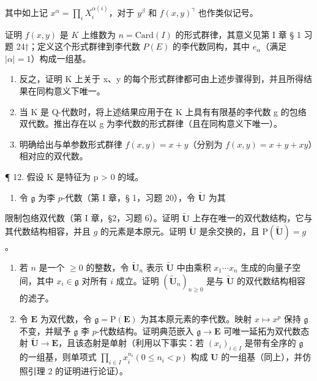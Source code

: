 其中如上记 \(x^{\alpha} = \prod_{i} X_{i}^{\alpha(i)}\)，对于 \(y^{\beta}\) 和 \(f(x, y)^{\gamma}\) 也作类似记号。

证明 \(f(x, y)\) 是 \(K\) 上维数为 \(n = \text{Card}(I)\) 的形式群律，其意义见第 I 章 § 1 习题 24†；定义这个形式群律到李代数 \(P(E)\) 的李代数同构，其中 \(e_{\alpha}\)（满足 \(|\alpha| = 1\)）构成一组基。

\begin{enumerate}
\def\labelenumi{(\alph{enumi})}
\setcounter{enumi}{2}
\item
  反之，证明 K 上关于 x、y 的每个形式群律都可由上述步骤得到，并且所得结果在同构意义下唯一。
\item
  当 K 是 Q-代数时，将上述结果应用于在 K 上具有有限基的李代数 g 的包络双代数。推出存在以 g 为李代数的形式群律（且在同构意义下唯一）。
\item
  明确给出与单参数形式群律 \(f(x, y) = x + y\)（分别为 \(f(x, y) = x + y + xy\)）相对应的双代数。
\end{enumerate}

¶ 12. 假设 K 是特征为 p > 0 的域。

\begin{enumerate}
\def\labelenumi{(\alph{enumi})}
\tightlist
\item
  令 \(\mathfrak{g}\) 为李 \(p\)-代数（第 I 章，§ 1，习题 20），令 \(\tilde{\mathbf{U}}\) 为其
\end{enumerate}


限制包络双代数（第 I 章，§2，习题 6）。证明 \(\tilde{\mathbf{U}}\) 上存在唯一的双代数结构，它与其代数结构相容，并且 \(g\) 的元素是本原元。证明 \(\tilde{\mathbf{U}}\) 是余交换的，且 \(\mathrm{P}(\tilde{\mathbf{U}}) = g\)。

\begin{enumerate}
\def\labelenumi{(\alph{enumi})}
\setcounter{enumi}{1}
\item
  若 \(n\) 是一个 \(\geqslant 0\) 的整数，令 \(\tilde{\mathbf{U}}_n\) 表示 \(\tilde{\mathbf{U}}\) 中由乘积 \(x_1\cdots x_n\) 生成的向量子空间，其中 \(x_i \in \mathfrak{g}\) 对所有 \(i\) 成立。证明 \((\tilde{\mathbf{U}}_n)_{n \geqslant 0}\) 是与 \(\tilde{\mathbf{U}}\) 的双代数结构相容的滤子。
\item
  令 \(\mathbf{E}\) 为双代数，令 \(\mathfrak{g} = \mathrm{P}(\mathbf{E})\) 为其本原元素的李代数。映射 \(x\mapsto x^p\) 保持 \(\mathfrak{g}\) 不变，并赋予 \(\mathfrak{g}\) 李 \(p\)-代数结构。证明典范嵌入 \(\mathfrak{g}\to \mathbf{E}\) 可唯一延拓为双代数态射 \(\tilde{\mathbf{U}}\rightarrow \mathbf{E}\)，且该态射是单射（利用以下事实：若 \((x_{i})_{i\in I}\) 是带有全序的 \(\mathfrak{g}\) 的一组基，则单项式 \(\prod_{i\in I}x_i^{n_i}(0\leqslant n_i < p)\) 构成 \(\mathbf{U}\) 的一组基（同上），并仿照引理 2 的证明进行论证）。
\end{enumerate}
